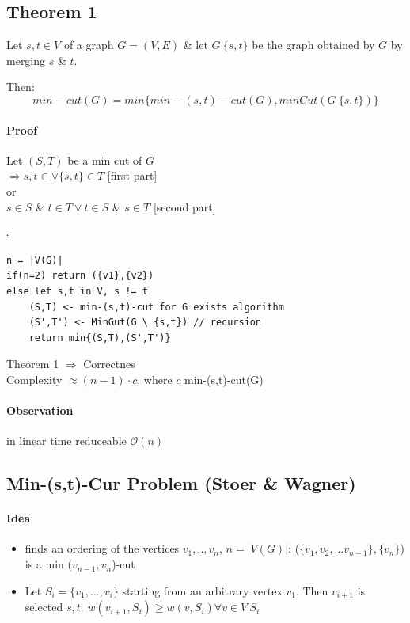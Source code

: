\subsection{Theorem 1}

Let $s,t \in V$ of a graph $G = (V,E)$ \& let $G \ \{s,t\}$ be the graph obtained by $G$ by merging $s$ \& $t$.

Then: 
$$min-cut(G) = min\{min-(s,t)-cut(G), minCut(G\ \{s,t\})\}$$


\paragraph{Proof} Let $(S,T)$ be a min cut of $G$ \\ 
$\Rightarrow {s,t} \in \lor \{s,t\} \in T$ [first part] \\
or \\
$s \in S$ \& $t \in T \lor t \in S$ \& $s \in T$ [second part]

\begin{flushright}
	$\square$
\end{flushright}



\begin{verbatim}
n = |V(G)|
if(n=2) return ({v1},{v2})
else let s,t in V, s != t
    (S,T) <- min-(s,t)-cut for G exists algorithm
    (S',T') <- MinGut(G \ {s,t}) // recursion
    return min{(S,T),(S',T')}
\end{verbatim}

Theorem 1 $\Rightarrow$ Correctnes \\

Complexity $\approx (n-1) \cdot c$, where $c$ min-(s,t)-cut(G) \\

\paragraph{Observation} in linear time reduceable $\mathcal{O}(n)$

\subsection{Min-(s,t)-Cur Problem (Stoer \& Wagner)}

\paragraph{Idea}
\begin{itemize}
	\item finds an ordering of the vertices $v_1,..,v_n$, $n = |V(G)|$: ($\{v_1,v_2,...v_{n-1}\},\{v_n\}$) is a min ($v_{n-1},v_n$)-cut
	\item Let $S_i = \{v_1,...,v_i\}$ starting from an arbitrary vertex $v_1$. Then $v_{i+1}$ is selected $s,t$. $w(v_{i+1},S_i) \geq w(v,S_i) \forall v\in V \ S_i$
\end{itemize}




